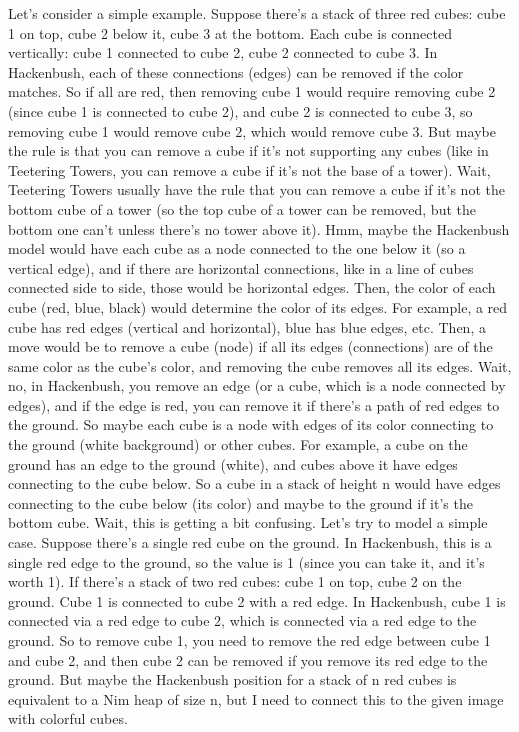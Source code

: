 Let's consider a simple example. Suppose there's a stack of three red cubes: cube 1 on top, cube 2 below it, cube 3 at the bottom. Each cube is connected vertically: cube 1 connected to cube 2, cube 2 connected to cube 3. In Hackenbush, each of these connections (edges) can be removed if the color matches. So if all are red, then removing cube 1 would require removing cube 2 (since cube 1 is connected to cube 2), and cube 2 is connected to cube 3, so removing cube 1 would remove cube 2, which would remove cube 3. But maybe the rule is that you can remove a cube if it's not supporting any cubes (like in Teetering Towers, you can remove a cube if it's not the base of a tower). Wait, Teetering Towers usually have the rule that you can remove a cube if it's not the bottom cube of a tower (so the top cube of a tower can be removed, but the bottom one can't unless there's no tower above it). Hmm, maybe the Hackenbush model would have each cube as a node connected to the one below it (so a vertical edge), and if there are horizontal connections, like in a line of cubes connected side to side, those would be horizontal edges. Then, the color of each cube (red, blue, black) would determine the color of its edges. For example, a red cube has red edges (vertical and horizontal), blue has blue edges, etc. Then, a move would be to remove a cube (node) if all its edges (connections) are of the same color as the cube's color, and removing the cube removes all its edges. Wait, no, in Hackenbush, you remove an edge (or a cube, which is a node connected by edges), and if the edge is red, you can remove it if there's a path of red edges to the ground. So maybe each cube is a node with edges of its color connecting to the ground (white background) or other cubes. For example, a cube on the ground has an edge to the ground (white), and cubes above it have edges connecting to the cube below. So a cube in a stack of height n would have edges connecting to the cube below (its color) and maybe to the ground if it's the bottom cube. Wait, this is getting a bit confusing. Let's try to model a simple case. Suppose there's a single red cube on the ground. In Hackenbush, this is a single red edge to the ground, so the value is 1 (since you can take it, and it's worth 1). If there's a stack of two red cubes: cube 1 on top, cube 2 on the ground. Cube 1 is connected to cube 2 with a red edge. In Hackenbush, cube 1 is connected via a red edge to cube 2, which is connected via a red edge to the ground. So to remove cube 1, you need to remove the red edge between cube 1 and cube 2, and then cube 2 can be removed if you remove its red edge to the ground. But maybe the Hackenbush position for a stack of n red cubes is equivalent to a Nim heap of size n, but I need to connect this to the given image with colorful cubes.

